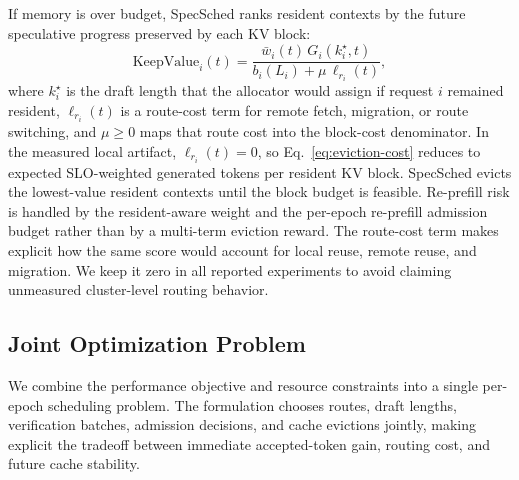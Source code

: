 \documentclass[journal]{IEEEtran}
\newcommand{\system}{SpecSched}
\begin{document}
If memory is over budget, \system{} ranks resident contexts by the
future speculative progress preserved by each KV block:
\begin{equation}
    \label{eq:eviction-cost}
    \text{KeepValue}_i(t) =
    \frac{\bar{w}_i(t)\,G_i(k_i^\star,t)}
    {b_i(L_i)+\mu\,\ell_{r_i}(t)} ,
\end{equation}
where $k_i^\star$ is the draft length that the allocator would assign
if request $i$ remained resident, $\ell_{r_i}(t)$ is a route-cost term
for remote fetch, migration, or route switching, and $\mu\geq0$ maps
that route cost into the block-cost denominator. In the measured local
artifact, $\ell_{r_i}(t)=0$, so Eq.~\eqref{eq:eviction-cost} reduces to
expected SLO-weighted generated tokens per resident KV block.
\system{} evicts the lowest-value resident contexts until the block
budget is feasible. Re-prefill risk is handled by the resident-aware
weight and the per-epoch re-prefill admission budget rather than by a
multi-term eviction reward.
The route-cost term makes explicit how the same score would account for
local reuse, remote reuse, and migration. We keep it zero in all
reported experiments to avoid claiming unmeasured cluster-level routing
behavior.

\subsection{Joint Optimization Problem}
\label{sec:model-optimization}

We combine the performance objective and resource constraints 
into a single per-epoch scheduling problem. The formulation 
chooses routes, draft lengths, verification batches, admission 
decisions, and cache evictions jointly, making explicit the 
tradeoff between immediate accepted-token gain, routing cost, and
future cache stability.
\end{document}
